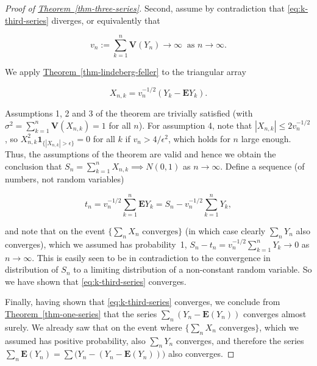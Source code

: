 \begin{proof}[Proof of \texorpdfstring{\hyperref[thm-three-series]{Theorem~\ref*{thm-three-series}}}{Theorem}]
Second, assume by contradiction that
\eqref{eq:k-third-series} diverges, or equivalently that

\[
v_n := \sum_{k=1}^n \mathbf{V}(Y_n) \to \infty\ \textrm{ as }n\to\infty.
\]

\noindent We apply \hyperref[thm-lindeberg-feller]{Theorem~\ref*{thm-lindeberg-feller}} to the
triangular array

\[
X_{n,k} = v_n^{-1/2} \left(Y_k - \mathbf{E} Y_k\right).
\]

\noindent Assumptions 1, 2 and 3 of the theorem are trivially
satisfied (with
$\sigma^2 = \sum_{k=1}^n \mathbf{V}(X_{n,k}) = 1$ for
all $n$). For assumption 4, note that
$|X_{n,k}| \le 2 v_n^{-1/2}$, so
$X_{n,k}^2 \mathbf{1}_{\{|X_{n,k}|>\epsilon\}} = 0$
for all $k$ if $v_n > 4/\epsilon^2$, which holds for
$n$ large enough. Thus, the assumptions of the
theorem are valid and hence we obtain the conclusion
that $S_n=\sum_{k=1}^n X_{n,k} \implies N(0,1)$ as
$n\to\infty$. Define a sequence (of numbers, not
random variables)

\[
t_n = v_n^{-1/2} \sum_{k=1}^n \mathbf{E} Y_k = S_n - v_n^{-1/2}\sum_{k=1}^n Y_k,
\]

\noindent and note that on the event
$\{\sum_n X_n \textrm{ converges} \}$ (in which case
clearly $\sum_n Y_n$ also converges), which we
assumed has probability~1,
$S_n-t_n = v_n^{-1/2} \sum_{k=1}^n Y_k \to 0$ as
$n\to\infty$. This is easily seen to be in
contradiction to the convergence in distribution of
$S_n$ to a limiting distribution of a non-constant
random variable. So we have shown that
\eqref{eq:k-third-series} converges.

Finally, having shown that \eqref{eq:k-third-series}
converges, we conclude from \hyperref[thm-one-series]{Theorem~\ref*{thm-one-series}}
that the series
$\sum_n \left(Y_n-\mathbf{E}(Y_n)\right)$ converges
almost surely. We already saw that on the event where
$\{ \sum_n X_n \textrm{ converges}\}$, which we
assumed has positive probability, also $\sum_n Y_n$
converges, and therefore the series
$\sum_n \mathbf{E}(Y_n) = \sum \big(Y_n -
(Y_n-\mathbf{E}(Y_n))\big)$
also converges.
\end{proof}
